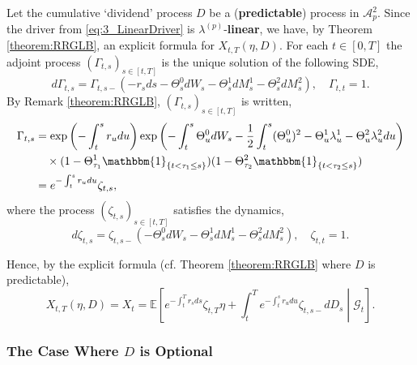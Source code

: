 \documentclass[11pt,a4paper]{article}
\numberwithin{equation}{section}
\theoremstyle{newPlain}
\theoremstyle{newDefinition}
\theoremstyle{newRemark}
\begin{document}
Let the cumulative `dividend' process $D$ be a (\textbf{predictable}) process  in  $\mathcal{A}_{p}^2$. Since the driver from \eqref{eq:3_LinearDriver} is $\lambda^{(p)}$-\textbf{linear}, we have, by Theorem \ref{theorem:RRGLB}, an explicit formula for $X_{t,T}(\eta,D)$. For each $t\in[0,T]$ the adjoint process $(\Gamma_{t,s})_{s\in[t,T]}$ is the unique solution of the following SDE,
\begin{equation*}\label{eq:3_AdjointProcess}
    d\Gamma_{t,s} = \Gamma_{t,s-}(-r_sds - \Theta_s^0dW_s - \Theta_s^1dM_s^1 - \Theta_s^2dM_s^2),\quad\Gamma_{t,t} = 1.
\end{equation*}
By Remark \ref{theorem:RRGLB}, $(\Gamma_{t,s})_{s\in[t,T]}$ is written,
\begin{align*}\label{eq:3_AdjointProcess2}
    \begin{aligned}
        \Gamma_{t,s} &= \exp\left(-\int_t^sr_udu\right)\exp\left(-\int_t^s\Theta_u^0dW_s -\frac{1}{2}\int_t^s(\Theta_u^0)^2-\Theta_u^1\lambda_u^1-\Theta_u^2\lambda_u^2 du\right)\\&\quad\times(1-\Theta_{\tau_1}^1\mathbbm{1}_{\{t<\tau_1\le s\}})(1-\Theta_{\tau_2}^2\mathbbm{1}_{\{t<\tau_2\le s\}})\\
        &=e^{-\int_t^sr_udu}\zeta_{t,s},
    \end{aligned}
\end{align*}
where the process $(\zeta_{t,s})_{s\in[t,T]}$ satisfies the dynamics,
\begin{equation}\label{eq:3_Zeta1}
    d\zeta_{t,s} = \zeta_{t,s-}(-\Theta_s^0dW_s - \Theta_s^1dM_s^1-\Theta_s^2dM_s^2),\quad\zeta_{t,t}=1.
\end{equation}

Hence, by the explicit formula (cf. Theorem \ref{theorem:RRGLB} where $D$ is predictable),
\begin{equation}\label{eq:3_RepresentationP1}
    X_{t,T}(\eta,D) = X_t = \mathbb{E}\left[e^{-\int_t^Tr_sds}\zeta_{t,T}\eta + \int_t^Te^{-\int_t^sr_udu}\zeta_{t,s-}dD_s\middle|  \mathcal{G}_t\right].
\end{equation}

\subsubsection{The Case Where $D$ is Optional}
\end{document}
